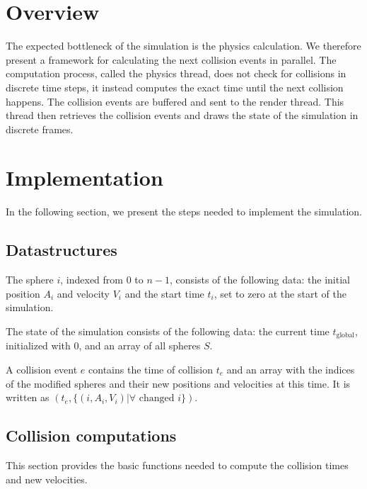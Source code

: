 \documentclass[journal, letterpaper]{IEEEtran}
\begin{document}
\section{Overview}
The expected bottleneck of the simulation is the physics calculation. We therefore present a framework for calculating the next collision events in parallel. 
The computation process, called the physics thread, does not check for collisions in discrete time steps, it instead computes the exact time until the next collision happens. The collision events are buffered and sent to the render thread. This thread then retrieves the collision events and draws the state of the simulation in discrete frames.

\section{Implementation}
In the following section, we present the steps needed to implement the simulation.

\subsection{Datastructures}
The sphere $i$, indexed from $0$ to $n-1$, consists of the following data: the initial position $A_i$ and velocity $V_i$ and the start time $t_i$, set to zero at the start of the simulation.

The state of the simulation consists of the following data: the current time $t_\text{global}$, initialized with 0, and an array of all spheres $S$.

A collision event $e$ contains the time of collision $t_e$ and an array with the indices of the modified spheres and their new positions and velocities at this time. It is written as $(t_e, \{(i, A_i, V_i) | \forall \text{ changed } i\})$.

\subsection{Collision computations}
This section provides the basic functions needed to compute the collision times and new velocities.
\end{document}
